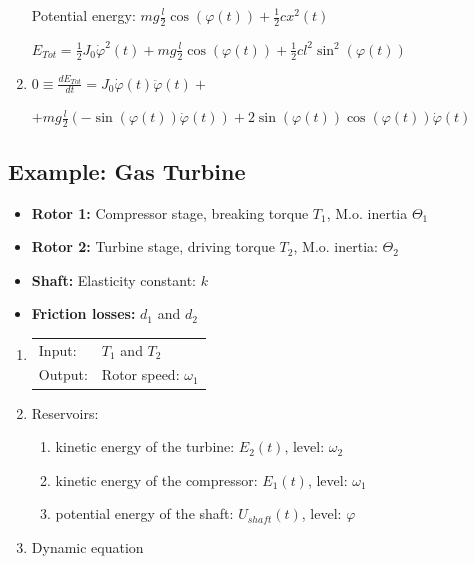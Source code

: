 \documentclass[10pt,a4paper]{scrartcl}
\begin{document}
\begin{multicols*}{3}
\begin{enumerate}
Potential energy: $mg\frac{l}{2}\cos(\varphi(t))+\frac{1}{2}cx^2(t)$

$E_{Tot}=\frac{1}{2}J_0\dot{\varphi}^2(t)+mg\frac{l}{2}\cos(\varphi(t))+\frac{1}{2}cl^2\sin^2(\varphi(t))$

\item $0\equiv\frac{dE_{Tot}}{dt}=J_0\dot{\varphi}(t)\ddot{\varphi}(t)+$ 

$+mg\frac{l}{2}\left(-\sin(\varphi(t))\dot{\varphi}(t)\right)+2\sin(\varphi(t))\cos(\varphi(t))\dot{\varphi}(t)$


\end{enumerate}


\subsection{Example: Gas Turbine}\label{GasTurbine}


\scriptsize
\begin{itemize}
\item\textbf{Rotor 1:} Compressor stage, breaking torque $T_1$, M.o. inertia $\Theta_1$
\item\textbf{Rotor 2:} Turbine stage, driving torque $T_2$, M.o. inertia: $\Theta_2$
\item\textbf{Shaft:} Elasticity constant: $k$
\item\textbf{Friction losses:} $d_1$ and $d_2$
\end{itemize}
\normalsize


\begin{enumerate}
\item \begin{tabular}{ll}Input: & $T_1$ and $T_2$\\ Output: & Rotor speed: $\omega_1$\end{tabular}
\item Reservoirs:
\begin{enumerate}
\item kinetic energy of the turbine: $E_2(t)$, level: $\omega_2$
\item kinetic energy of the compressor: $E_1(t)$, level: $\omega_1$
\item potential energy of the shaft: $U_{shaft}(t)$, level: $\varphi$
\end{enumerate}
\item Dynamic equation


\end{enumerate}
\end{multicols*}
\end{document}
